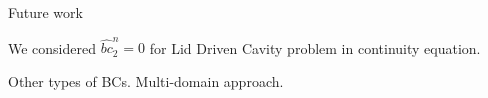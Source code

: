 \documentclass{beamer}
\begin{document}
	\begin{frame}{Future work}
	
	We considered $\hat{bc}_2^n=0$ for Lid Driven Cavity problem in continuity equation.
	
	Other types of BCs. Multi-domain approach.
	\begin{figure}[H] %
  \caption{}\label{fig:}
\end{figure}

		
	\end{frame}
	
	
	
	
	
	
\end{document}
